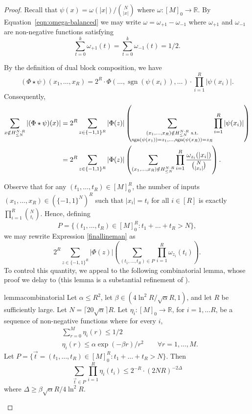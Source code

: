 \documentclass[11pt, letterpaper, fleqn]{article}
\theoremstyle{plain}
\newcommand{\R}{\mathbb{R}}
\newcommand{\sgn}{\mathrm{sign}}
\newcommand{\bits}{\{-1,1\}}
\newcommand{\ls}{\star}
\renewcommand{\sgn}{\operatorname{sgn}}
\begin{document}
\begin{proof}
 Recall that $\psi(x) = \omega(|x|) / \binom{N}{|x|}$ where $\omega \colon [M]_{0} \to \R$. By Equation~\eqref{eqn:omega-balanced} we may write $\omega = \omega_{+1} - \omega_{-1}$  where $\omega_{+1}$ and $\omega_{-1}$ are non-negative
functions satisfying
\begin{equation} \label{eq:sweeteq} \sum_{t=0}^k \omega_{+1}(t) = \sum_{t=0}^k \omega_{-1}(t) = 1/2.\end{equation}



By the definition of dual block composition, we have
\[(\Phi \ls \psi)(x_1, \dots, x_R) = 2^R \cdot \Phi(\dots, \sgn\left(\psi(x_i)\right), \dots) \cdot \prod_{i = 1}^R |\psi(x_i)|.\]
Consequently,
\begin{align}
\notag \sum_{x \notin H_{\le N}^{N \cdot R}} |(\Phi \ls \psi)(x)| &= 2^R \sum_{z \in \bits^R} |\Phi(z)| \left( \sum_{\substack{(x_1, \dots, x_R) \notin  H_{\le N}^{N \cdot R} \text{ s.t.} \\ \notag \sgn\left( \psi(x_1)\right) = z_1, \dots, \sgn\left(\psi(x_R)\right) = z_R}} \prod_{i = 1}^R |\psi(x_i)| \right) \\
&= 2^R \sum_{z \in \bits^R} |\Phi(z)| \left( \sum_{(x_1, \dots, x_R) \notin H_{\le N}^{N \cdot R}} \prod_{i = 1}^R \frac{\omega_{z_i}(|x_i|)}{\binom{N}{ |x_i|}} \right). \label{finallineman}
\end{align}

Observe that for any $(t_1, \dots, t_R) \in [M]_0^R$, the number of inputs $(x_1, \dots, x_R) \in \left(\bits^N\right)^R$
such that $|x_i| = t_i$ for all $i \in [R]$ is exactly $\prod_{i=1}^{R} \binom{N}{ t_i}$. 
Hence, defining $$P = \{(t_1, \dots, t_R) \in [M]_0^R : t_1 + \dots + t_R > N\},$$ we
may rewrite Expression
\eqref{finallineman} as
\[2^R \sum_{z \in \bits^R} |\Phi(z)| \left( \sum_{(t_1, \dots, t_R) \in P} \prod_{i = 1}^R \omega_{z_i}(t_i) \right).\]
To control this quantity, we appeal to the following combinatorial lemma,
whose proof we delay to  (this lemma
is a substantial refinement of \cite[Lemma 32]{adegsurj}).

\begin{restatable}{lemma}{combinatorial} \label{lem:combinatorial}
Let $\alpha \le R^2$, let $\beta \in (4\ln^2 R/ \sqrt{\alpha} R, 1)$, and let $R$ be sufficiently large. Let $N = \lceil 20 \sqrt{\alpha}\rceil R$. Let $\eta_i :[M]_0 \to \R$, for $i = 1, \dots R$, be a sequence of non-negative functions where for every $i$,
\begin{align}&\sum_{r = 0}^M \eta_i(r) \le 1 / 2     \label{eqn:eta-bound} \\
&\eta_i(r) \le \alpha \exp(-\beta r) / r^2  \qquad \forall r = 1, \dots, M.     \label{eqn:eta-decay} 
\end{align}
Let $P = \{\vec{t} = (t_1, \dots, t_R) \in [M]_0^R : t_1 + \dots + t_R > N\}$. Then
\[\sum_{\vec{t} \in P} \prod_{i = 1}^R  \eta_i(t_i) \le 2^{-R} \cdot (2NR)^{-2\Delta}\]
where $\Delta \ge \beta\sqrt{\alpha} R / 4\ln^2 R$.
\end{restatable}


\end{proof}
\end{document}
